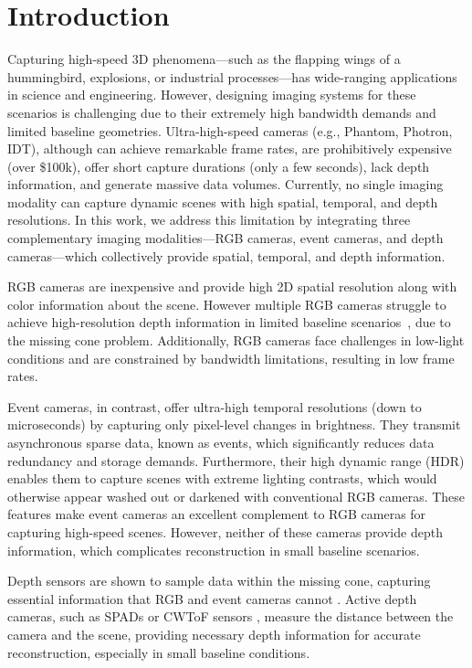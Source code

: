 \section{Introduction}\feedbackNeeded
\label{intro}

Capturing high-speed 3D phenomena---such as the flapping wings of a hummingbird, explosions, or industrial processes---has wide-ranging applications in science and engineering. 
However, designing imaging systems for these scenarios is challenging due to their extremely high bandwidth demands and limited baseline geometries. 
Ultra-high-speed cameras (e.g., Phantom, Photron, IDT), although can achieve remarkable frame rates, are prohibitively expensive (over \$100k), offer short capture durations (only a few seconds), lack depth information, and generate massive data volumes. 
Currently, no single imaging modality can capture dynamic scenes with high spatial, temporal, and depth resolutions. 
In this work, we address this limitation by integrating three complementary imaging modalities---RGB cameras, event cameras, and depth cameras---which collectively provide spatial, temporal, and depth information.

RGB cameras are inexpensive and provide high 2D spatial resolution along with color information about the scene. However multiple RGB cameras struggle to achieve high-resolution depth information in limited baseline scenarios~\cite{qadri2024aoneus, qu2024z}, due to the missing cone problem. 
Additionally, RGB cameras face challenges in low-light conditions and are constrained by bandwidth limitations, resulting in low frame rates. 

Event cameras, in contrast, offer ultra-high temporal resolutions (down to microseconds) by capturing only pixel-level changes in brightness. They transmit asynchronous sparse data, known as events, which significantly reduces data redundancy and storage demands. Furthermore, their high dynamic range (HDR) enables them to capture scenes with extreme lighting contrasts, which would otherwise appear washed out or darkened with conventional RGB cameras. 
These features make event cameras an excellent complement to RGB cameras for capturing high-speed scenes.
However, neither of these cameras provide depth information, which complicates reconstruction in small baseline scenarios.

Depth sensors are shown to sample data within the missing cone, capturing essential information that RGB and event cameras cannot \cite{qu2024z}. 
Active depth cameras, such as SPADs \cite{gupta2019photon, folden2024foveaspad, gupta2019asynchronous, jungerman20223d, po2022adaptive} or CWToF sensors \cite{keetha2024splatam, friday2024snapshot, he2019recent, shrestha2016computational}, measure the distance between the camera and the scene, providing necessary depth information for accurate reconstruction, especially in small baseline conditions. 


